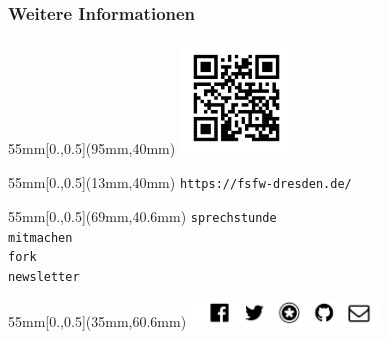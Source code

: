 \documentclass{beamer}
\begin{document}
\begin{frame}[label=ct4]
  \frametitle{Weitere Informationen}

  \begin{textblock*}{55mm}[0.,0.5](95mm,40mm)
    \includegraphics[width=30mm]{img-src/website-qr}
  \end{textblock*}

  \begin{textblock*}{55mm}[0.,0.5](13mm,40mm)
    \texttt{https://fsfw-dresden.de/}
  \end{textblock*}


  \begin{textblock*}{55mm}[0.,0.5](69mm,40.6mm)
    \texttt{sprechstunde}\\[1mm]
    \texttt{mitmachen}\\[1mm]
    \texttt{fork}\\[1mm]
    \texttt{newsletter}\\[1mm]
  \end{textblock*}

  \begin{textblock*}{55mm}[0.,0.5](35mm,60.6mm)
    \includegraphics[width=50mm]{img-src/fsfw-netzwerke}
  \end{textblock*}

\end{frame}
\end{document}
